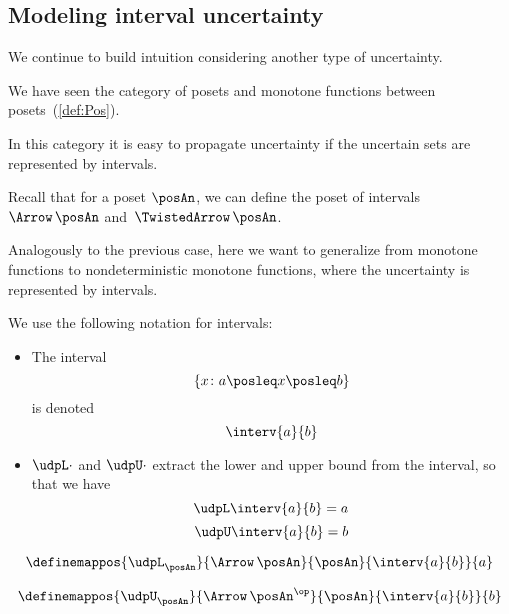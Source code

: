 \subsection{Modeling interval uncertainty}

We continue to build intuition considering another type of uncertainty.

We have seen the category \Pos of posets and monotone functions between posets~(\cref{def:Pos}). 

In this category it is easy to propagate uncertainty if the uncertain sets are represented by intervals. 

Recall that for a poset $\posAn$, we can define the poset of intervals~$\Arrow\,\posAn$
and~$\TwistedArrow\,\posAn$.


Analogously to the previous case, here we want to generalize from monotone functions to nondeterministic monotone functions, where the uncertainty is represented by intervals.

We use the following notation for intervals:
\begin{itemize}
\item The interval
 \begin{equation}\label{eq:interv-1}
    \{x\colon a \posleq x \posleq b\}
 \end{equation}
 is denoted 
 \begin{equation}\label{eq:interv-2}
    \interv{a}{b}
\end{equation}
\item $\udpL\cdot$ and $\udpU\cdot$ extract the lower and upper bound from the interval, so that we have
\begin{equation}\label{eq:interv-L}
    \udpL \interv{a}{b} = a
\end{equation}
\begin{equation}\label{eq:interv-U}
    \udpU \interv{a}{b} = b
\end{equation}
\end{itemize}

\begin{equation}\label{eq:interv-L-def}
    \definemappos{\udpL_{\posAn}}{\Arrow\,\posAn}{\posAn}%
    {\interv{a}{b}}{ a }
\end{equation}

\begin{equation}\label{eq:interv-U-def}
    \definemappos{\udpU_{\posAn}}{\Arrow\,\posAn^{\op}}{\posAn}%
    {\interv{a}{b}}{ b }
\end{equation}


